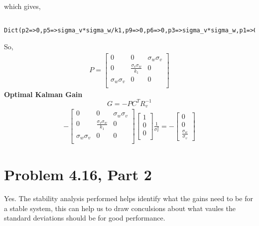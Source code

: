 \documentclass[paper=a4, fontsize=11pt]{scrartcl}
\numberwithin{equation}{section}		%
\numberwithin{figure}{section}			%
\numberwithin{table}{section}				%
\begin{document}
which gives,
\begin{lstlisting}
 Dict(p2=>0,p5=>sigma_v*sigma_w/k1,p9=>0,p6=>0,p3=>sigma_v*sigma_w,p1=>0)                                                                                                                                                                                                                                                                                                                                                                                                                                                                                                                                                                         
\end{lstlisting}
So,
\begin{align*}
P=
\begin{bmatrix}
0 & 0 & \sigma_w \sigma_v\\
0 & \frac{\sigma_v \sigma_w}{k_1} & 0\\
\sigma_w \sigma_v & 0 & 0 \\
\end{bmatrix}
\end{align*}
\textbf{Optimal Kalman Gain}\\
$$G=-PC^TR^{-1}_{v}$$
\begin{align*}
-\begin{bmatrix}
0 & 0 & \sigma_w \sigma_v\\
0 & \frac{\sigma_v \sigma_w}{k_1} & 0\\
\sigma_w \sigma_v & 0 & 0 \\
\end{bmatrix}
\begin{bmatrix}
1\\
0\\
0\\
\end{bmatrix}
\frac{1}{\sigma_v^2}=-
\begin{bmatrix}
0\\
0\\
\frac{\sigma_w}{\sigma_v}
\end{bmatrix}
\end{align*}
\section*{Problem 4.16, Part 2}
Yes. The stability analysis performed helps identify what the gains need to be for a stable system, this can help us to draw conculsions about what vaules the standard deviations should be for good performance.
\end{document}
